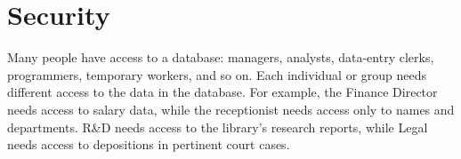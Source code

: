 %
%
%
%
%
%
%
%

\chapter{Security}{\label{Chp:Sec}}

Many people have access to a database:  managers, analysts, data-entry
clerks, programmers, temporary workers, and so on.  Each individual or
group needs different access to the data in the database.  For
example, the Finance Director needs access to salary data, while the
receptionist needs access only to names and departments.  R\&D needs
access to the library's research reports, while Legal needs access to
depositions in pertinent court cases.


